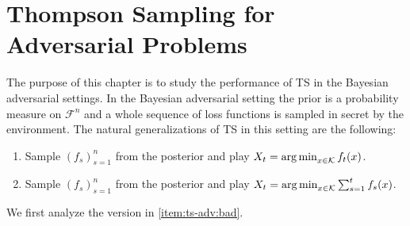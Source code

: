 \documentclass[letter, 12pt]{report}
\newcommand{\argmin}{\operatornamewithlimits{arg\,min}}
\newcommand{\cK}{\mathcal K}
\newcommand{\sF}{\mathscr F}
\newcommand{\1}{\mathbf{1}}
\newcommand{\ts}{\textsc{TS}\xspace}
\theoremstyle{plain}
\theoremstyle{definition}
\theoremstyle{remark}
\begin{document}
\chapter{Thompson Sampling for Adversarial Problems}
\label{ch:ts-adv}
The purpose of this chapter is to study the performance of \ts in the Bayesian adversarial settings.
In the Bayesian adversarial setting the prior is a probability measure on $\sF^n$ and a whole sequence of loss functions is sampled in secret
by the environment.
The natural generalizations of \ts{} in this setting are the following:
\begin{enumerate}
    \item Sample $(f_s)_{s=1}^n$ from the posterior and play $X_t = \argmin_{x \in \cK} f_t(x)$. \label{item:ts-adv:bad}
    \item Sample $(f_s)_{s=1}^n$ from the posterior and play $X_t = \argmin_{x \in \cK} \sum_{s=1}^t f_s(x)$. \label{item:ts-adv:ok}
\end{enumerate}
We first analyze the version in \ref{item:ts-adv:bad}.
\end{document}

